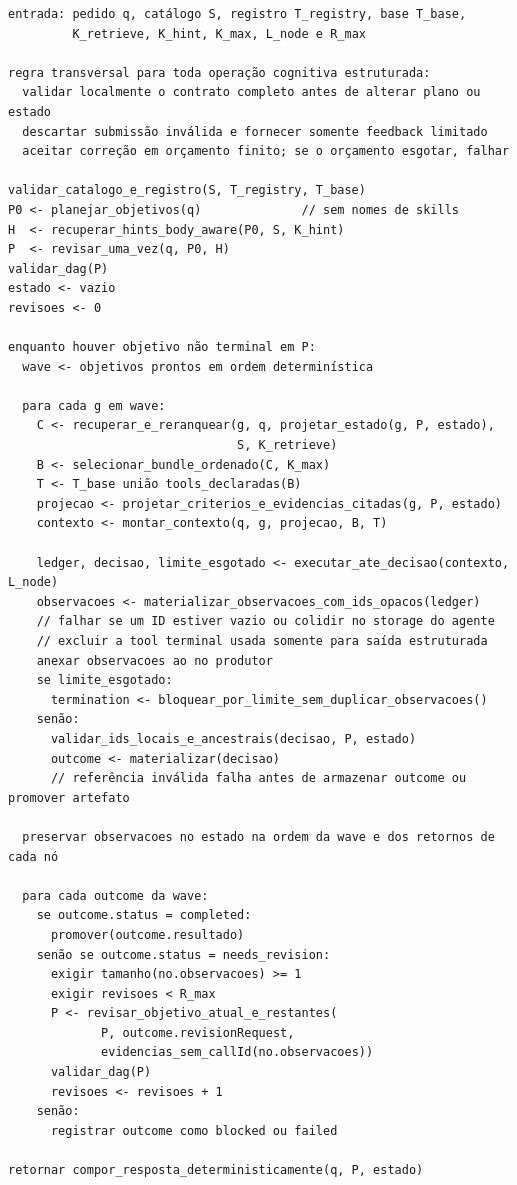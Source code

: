 \documentclass[12pt,a4paper]{article}
\begin{document}
\begin{Verbatim}[breaklines=true,breakanywhere=true,fontsize=\small]
entrada: pedido q, catálogo S, registro T_registry, base T_base,
         K_retrieve, K_hint, K_max, L_node e R_max

regra transversal para toda operação cognitiva estruturada:
  validar localmente o contrato completo antes de alterar plano ou estado
  descartar submissão inválida e fornecer somente feedback limitado
  aceitar correção em orçamento finito; se o orçamento esgotar, falhar

validar_catalogo_e_registro(S, T_registry, T_base)
P0 <- planejar_objetivos(q)              // sem nomes de skills
H  <- recuperar_hints_body_aware(P0, S, K_hint)
P  <- revisar_uma_vez(q, P0, H)
validar_dag(P)
estado <- vazio
revisoes <- 0

enquanto houver objetivo não terminal em P:
  wave <- objetivos prontos em ordem determinística

  para cada g em wave:
    C <- recuperar_e_reranquear(g, q, projetar_estado(g, P, estado),
                                S, K_retrieve)
    B <- selecionar_bundle_ordenado(C, K_max)
    T <- T_base união tools_declaradas(B)
    projecao <- projetar_criterios_e_evidencias_citadas(g, P, estado)
    contexto <- montar_contexto(q, g, projecao, B, T)

    ledger, decisao, limite_esgotado <- executar_ate_decisao(contexto, L_node)
    observacoes <- materializar_observacoes_com_ids_opacos(ledger)
    // falhar se um ID estiver vazio ou colidir no storage do agente
    // excluir a tool terminal usada somente para saída estruturada
    anexar observacoes ao no produtor
    se limite_esgotado:
      termination <- bloquear_por_limite_sem_duplicar_observacoes()
    senão:
      validar_ids_locais_e_ancestrais(decisao, P, estado)
      outcome <- materializar(decisao)
      // referência inválida falha antes de armazenar outcome ou promover artefato

  preservar observacoes no estado na ordem da wave e dos retornos de cada nó

  para cada outcome da wave:
    se outcome.status = completed:
      promover(outcome.resultado)
    senão se outcome.status = needs_revision:
      exigir tamanho(no.observacoes) >= 1
      exigir revisoes < R_max
      P <- revisar_objetivo_atual_e_restantes(
             P, outcome.revisionRequest,
             evidencias_sem_callId(no.observacoes))
      validar_dag(P)
      revisoes <- revisoes + 1
    senão:
      registrar outcome como blocked ou failed

retornar compor_resposta_deterministicamente(q, P, estado)
\end{Verbatim}
\end{document}
